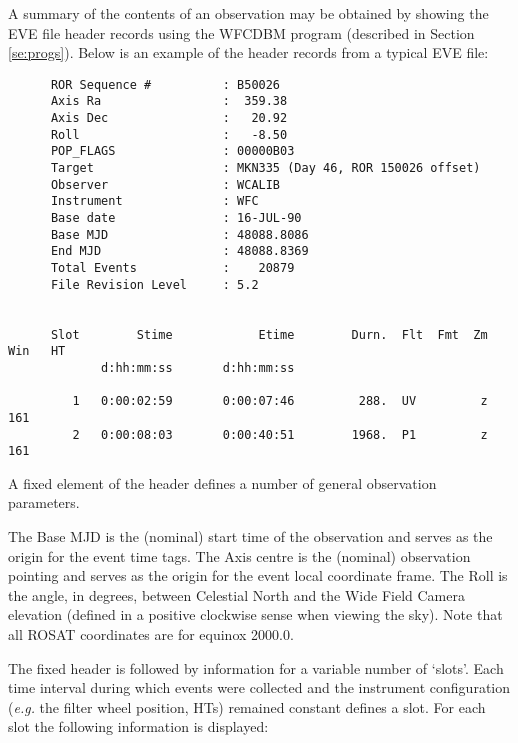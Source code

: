  A summary of the contents of an observation may be obtained by showing 
the EVE file header records using the WFCDBM program (described in
Section \ref{se:progs}). Below is an example of the header records from a typical EVE
file:

\begin{small}
\begin{verbatim}
      ROR Sequence #          : B50026    
      Axis Ra                 :  359.38
      Axis Dec                :   20.92
      Roll                    :   -8.50
      POP_FLAGS               : 00000B03
      Target                  : MKN335 (Day 46, ROR 150026 offset)      
      Observer                : WCALIB                                  
      Instrument              : WFC                                     
      Base date               : 16-JUL-90  
      Base MJD                : 48088.8086
      End MJD                 : 48088.8369
      Total Events            :    20879
      File Revision Level     : 5.2 


      Slot        Stime            Etime        Durn.  Flt  Fmt  Zm  Win   HT
             d:hh:mm:ss       d:hh:mm:ss

         1   0:00:02:59       0:00:07:46         288.  UV         z       161
         2   0:00:08:03       0:00:40:51        1968.  P1         z       161
\end{verbatim}
\end{small}

A fixed element of the header defines a number of general observation
parameters.

The Base MJD is the (nominal) start time of the observation and serves as the
origin for the event time tags. The Axis centre is the (nominal) observation
pointing and serves as the origin for the event local coordinate frame. The
Roll is the angle, in degrees, between Celestial North and the Wide Field
Camera elevation (defined in a positive clockwise sense when viewing the sky).
Note that all ROSAT coordinates are for  equinox 2000.0.

The fixed header is followed by information for a variable number of `slots'.
Each time interval during which events were collected and the instrument
configuration ({\it e.g.} the filter wheel position, HTs)  remained constant
defines a slot. For each slot the following information is displayed:

